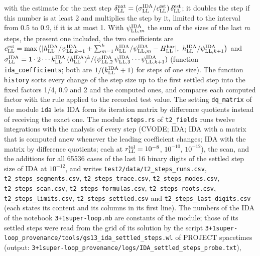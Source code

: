 \documentclass[
  10pt,
]{article}
\begin{document}
\begin{itemize}
  with the estimate for the next step
  \(\delta^{\rm nxt}_{\rm LL}=(\sigma^{\rm IDA}_{\rm LL}/c^{\rm est}_{\rm LL})\,\delta^{\rm est}_{\rm LL}\);
  it doubles the step if this number is at least 2 and multiplies the
  step by it, limited to the interval from 0.5 to 0.9, if it is at most
  1. With \(\psi^{\rm IDA}_{{\rm LL},m}\) the sum of the sizes of the
  last \emph{m} steps, the present one included, the two coefficients
  are
  \(c^{\rm est}_{\rm LL}=\max\big(\lvert h^{\rm IDA}_{\rm LL}/\psi^{\rm IDA}_{{\rm LL},k+1}+\sum_{m=1}^{k}h^{\rm IDA}_{\rm LL}/\psi^{\rm IDA}_{{\rm LL},m}-H^{\rm har}_{\rm LL}\rvert,\ h^{\rm IDA}_{\rm LL}/\psi^{\rm IDA}_{{\rm LL},k+1}\big)\)
  and
  \(\sigma^{\rm IDA}_{\rm LL}=1\cdot2\cdots k^{\rm IDA}_{\rm LL}\,(h^{\rm IDA}_{\rm LL})^{k}/(\psi^{\rm IDA}_{{\rm LL},2}\,\psi^{\rm IDA}_{{\rm LL},3}\cdots\psi^{\rm IDA}_{{\rm LL},k+1})\)
  (function \texttt{ida\_coefficients}; both are
  \(1/(k^{\rm IDA}_{\rm LL}+1)\) for steps of one size). The function
  \texttt{history} sorts every change of the step size up to the first
  settled step into the fixed factors 1/4, 0.9 and 2 and the computed
  ones, and compares each computed factor with the rule applied to the
  recorded test value. The setting \texttt{dq\_matrix} of the module
  \texttt{ida} lets IDA form its iteration matrix by difference
  quotients instead of receiving the exact one. The module
  \texttt{steps.rs} of \texttt{t2\_fields} runs twelve integrations with
  the analysis of every step (CVODE; IDA; IDA with a matrix that is
  computed anew whenever the leading coefficient changes; IDA with the
  matrix by difference quotients; each at
  \(r^{\rm tol}_{\rm LL}=10^{-8}\), \(10^{-10}\), \(10^{-12}\)), the
  scan, and the additions for all 65536 cases of the last 16 binary
  digits of the settled step size of IDA at \(10^{-12}\), and writes
  \texttt{test2/data/t2\_steps\_runs.csv},
  \texttt{t2\_steps\_segments.csv}, \texttt{t2\_steps\_trace.csv},
  \texttt{t2\_steps\_modes.csv}, \texttt{t2\_steps\_scan.csv},
  \texttt{t2\_steps\_formulas.csv}, \texttt{t2\_steps\_roots.csv},
  \texttt{t2\_steps\_limits.csv}, \texttt{t2\_steps\_settled.csv} and
  \texttt{t2\_steps\_last\_digits.csv} (each states its content and its
  columns in its first line). The numbers of the IDA of the notebook
  \texttt{3+1super-loop.nb} are constants of the module; those of its
  settled steps were read from the grid of its solution by the script
  \texttt{3+1super-loop\_provenance/tools/gs13\_ida\_settled\_steps.wl}
  of PROJECT spacetimes (output:
  \texttt{3+1super-loop\_provenance/logs/IDA\_settled\_steps\_probe.txt}),

\end{itemize}
\end{document}
